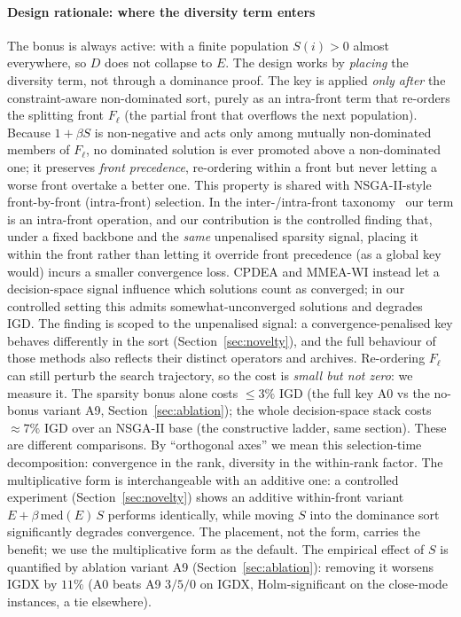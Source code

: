 \paragraph{Design rationale: where the diversity term enters} The bonus is always active: with a
finite population $S(i)>0$ almost everywhere, so $D$ does not collapse to $E$. The design works by
\emph{placing} the diversity term, not through a dominance proof.
The key is applied \emph{only after} the constraint-aware non-dominated sort, purely as an
intra-front term that re-orders the splitting front $F_\ell$ (the partial front that overflows the
next population). Because $1+\beta S$ is non-negative and acts only among mutually
non-dominated members of $F_\ell$, no dominated solution is ever promoted above a
non-dominated one; it preserves \emph{front precedence}, re-ordering within a front but never
letting a worse front overtake a better one. This property is shared with NSGA-II-style
front-by-front (intra-front) selection. In the inter-/intra-front
taxonomy~\parencite{javadi2022interfront} our term is an intra-front operation, and our contribution is
the controlled finding that, under a fixed backbone and the \emph{same} unpenalised sparsity
signal, placing it within the front rather than letting it override front precedence (as a global
key would) incurs a smaller convergence loss. CPDEA and MMEA-WI instead let a decision-space signal
influence which solutions count as converged; in our controlled setting this admits
somewhat-unconverged solutions and degrades IGD. The finding is scoped to the unpenalised signal:
a convergence-penalised key behaves differently in the sort (Section~\ref{sec:novelty}), and the
full behaviour of those methods also reflects their distinct operators and archives.
Re-ordering $F_\ell$ can still perturb the search trajectory, so the cost is \emph{small but
not zero}: we measure it. The sparsity bonus alone costs $\le 3\%$ IGD
(the full key A0 vs the no-bonus variant A9, Section~\ref{sec:ablation}); the whole decision-space
stack costs $\approx 7\%$ IGD over an NSGA-II base (the constructive ladder, same section). These
are different comparisons. By ``orthogonal axes'' we mean this selection-time decomposition:
convergence in the rank, diversity in the within-rank factor. The multiplicative form is
interchangeable with an additive one: a controlled
experiment (Section~\ref{sec:novelty}) shows an additive within-front variant
$E+\beta\,\mathrm{med}(E)\,S$ performs identically, while moving $S$ into the dominance sort
significantly degrades convergence. The placement, not the form, carries the benefit; we use
the multiplicative form as the default. The empirical effect of $S$ is quantified by ablation variant A9
(Section~\ref{sec:ablation}): removing it worsens IGDX by $11\%$ (A0 beats A9 $3/5/0$ on IGDX,
Holm-significant on the close-mode instances, a tie elsewhere).

